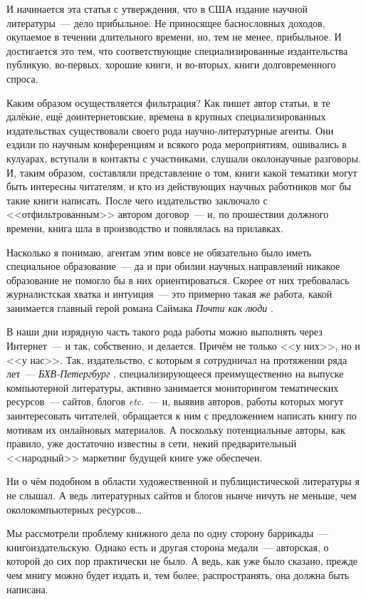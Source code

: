 И начинается эта статья с утверждения, что в США издание научной литературы~--- дело прибыльное. Не приносящее баснословных доходов, окупаемое в течении длительного времени, но, тем не менее, прибыльное. И достигается это тем, что соответствующие специализированные издантельства публикую, во-первых, хорошие книги, и во-вторых, книги долговременного спроса.

Каким образом осуществляется фильтрация? Как пишет автор статьи, в те далёкие, ещё доинтернетовские, времена в крупных специализированных издательствах существовали своего рода научно-литературные агенты. Они ездили по научным конференциям и всякого рода мероприятиям, ошивались в кулуарах, вступали в контакты с участниками, слушали околонаучные разговоры. И, таким образом, составляли представление о том, книги какой тематики могут быть интересны читателям, и кто из действующих научных работников мог бы такие книги написать. После чего издательство заключало с <<отфильтрованным>> автором договор~--- и, по прошествии должного времени, книга шла в производство и появлялась на прилавках.

Насколько я понимаю, агентам этим вовсе не обязательно было иметь специальное образование~--- да и при обилии научных направлений никакое образование не помогло бы в них ориентироваться. Скорее от них требовалась журналистская хватка и интуиция~--- это примерно такая же работа, какой занимается главный герой романа Саймака 
\textit{Почти как люди}
.

В наши дни изрядную часть такого рода работы можно выполнять через Интернет~--- и так, собственно, и делается. Причём не только <<у них>>, но и <<у нас>>. Так, издательство, с которым я сотрудничал на протяжении ряда лет~--- 
\textit{БХВ-Петергбург}
, специализирующееся преимущественно на выпуске компьютерной литературы, активно занимается мониторингом тематических ресурсов~--- сайтов, блогов \textit{etc}.~--- и, выявив авторов, работы которых могут заинтересовать читателей, обращается к ним с предложением написать книгу по мотивам их онлайновых материалов. А поскольку потенциальные авторы, как правило, уже достаточно известны в сети, некий предварительный <<народный>> маркетинг будущей книге уже обеспечен.

Ни о чём подобном в области художественной и публицистической литературы я не слышал. А ведь литературных сайтов и блогов нынче ничуть не меньше, чем околокомпьютерных ресурсов\dots

Мы рассмотрели проблему книжного дела по одну сторону баррикады~--- книгоиздательскую. Однако есть и другая сторона медали~--- авторская, о которой до сих пор практически не было. А ведь, как уже было сказано, прежде чем мнигу можно будет издать и, тем более, распространять, она должна быть написана.

